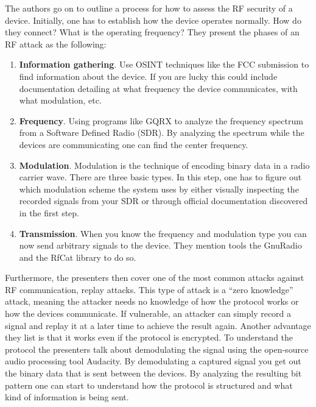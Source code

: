 The authors go on to outline a process for how to assess the RF security of a device. Initially, one has to establish how the device operates normally. How do they connect? What is the operating frequency? They present the phases of an RF attack as the following:
\begin{enumerate}
    \item \textbf{Information gathering}. Use \gls{OSINT} techniques like the FCC submission to find information about the device. If you are lucky this could include documentation detailing at what frequency the device communicates, with what modulation, etc.
    
    \item \textbf{Frequency}. Using programs like GQRX to analyze the frequency spectrum from a Software Defined Radio (SDR). By analyzing the spectrum while the devices are communicating one can find the center frequency.
    
    \item \textbf{Modulation}. Modulation is the technique of encoding binary data in a radio carrier wave. There are three basic types. In this step, one has to figure out which modulation scheme the system uses by either visually inspecting the recorded signals from your SDR or through official documentation discovered in the first step.
    
    \item \textbf{Transmission}. When you know the frequency and modulation type you can now send arbitrary signals to the device. They mention tools the GnuRadio and the RfCat library to do so.
\end{enumerate}
Furthermore, the presenters then cover one of the most common attacks against RF communication, replay attacks. This type of attack is a \enquote{zero knowledge} attack, meaning the attacker needs no knowledge of how the protocol works or how the devices communicate. If vulnerable, an attacker can simply record a signal and replay it at a later time to achieve the result again. Another advantage they list is that it works even if the protocol is encrypted. To understand the protocol the presenters talk about demodulating the signal using the open-source audio processing tool Audacity. By demodulating a captured signal you get out the binary data that is sent between the devices. By analyzing the resulting bit pattern one can start to understand how the protocol is structured and what kind of information is being sent.

